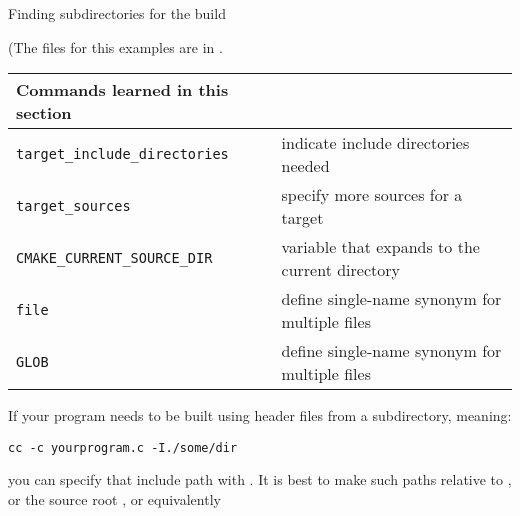 \newpage
{} {Finding subdirectories for the build}

(The files for this examples are in .

\begin{tabular}{lp{3in}}
  \toprule
  Commands learned in this section\\
  \midrule
  \lstinline+target_include_directories+&indicate include directories needed\\
  \lstinline+target_sources+&specify more sources for a target\\
  \lstinline+CMAKE_CURRENT_SOURCE_DIR+&variable that expands to the current directory\\
  \lstinline+file+&define single-name synonym for multiple files\\
  \lstinline+GLOB+&define single-name synonym for multiple files\\
  \bottomrule
\end{tabular}

\begin{floatingfigure}[r]{2.5in}
  \begin{minipage}{2.5in}
  \end{minipage}
\end{floatingfigure}
%
If your program needs to be built using header files from a subdirectory,
meaning:
\begin{verbatim}
cc -c yourprogram.c -I./some/dir
\end{verbatim}
you can specify that include path with .
It is best to make such paths relative to
,
or the source root ,
or equivalently 

